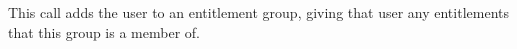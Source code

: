 This call adds the user to an entitlement group, giving that user any entitlements that this group
is a member of.
